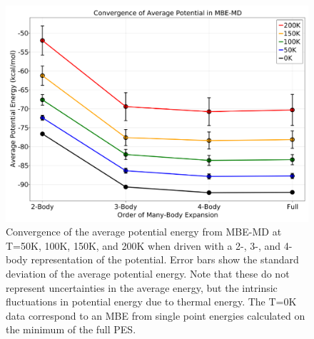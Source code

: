 \begin{figure}[t]
\uwsinglespace
\begin{center}
\begin{minipage}{0.8\textwidth}
\includegraphics[width=\textwidth]{Figures/Chapter_4/ch4_figure_3.png}
\end{minipage}
\end{center}
\begin{spacing}{1.0}
\caption[Convergence of the average potential energy from MBE-MD at T=50K, 100K, 150K, and 200K when driven with a 2-, 3-, and 4-body representation of the potential. Error bars show the standard deviation of the average potential energy. Note that these do not represent uncertainties in the average energy, but the intrinsic fluctuations in potential energy due to thermal energy. The T=0K data correspond to an MBE from single point energies calculated on the minimum of the full PES.]{Convergence of the average potential energy from MBE-MD at T=50K, 100K, 150K, and 200K when driven with a 2-, 3-, and 4-body representation of the potential. Error bars show the standard deviation of the average potential energy. Note that these do not represent uncertainties in the average energy, but the intrinsic fluctuations in potential energy due to thermal energy. The T=0K data correspond to an MBE from single point energies calculated on the minimum of the full PES.}\label{fig:MBE_MD_F3}
\end{spacing}
\end{figure}
